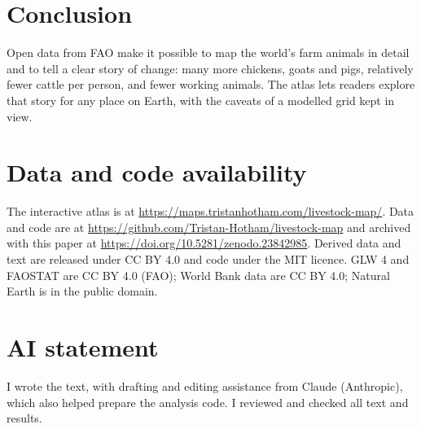 \documentclass[11pt,a4paper]{article}
\begin{document}
\section{Conclusion}
Open data from FAO make it possible to map the world's farm animals in detail and to tell a clear story of change: many more chickens, goats and pigs, relatively fewer cattle per person, and fewer working animals. The atlas lets readers explore that story for any place on Earth, with the caveats of a modelled grid kept in view.

\section*{Data and code availability}
The interactive atlas is at \url{https://maps.tristanhotham.com/livestock-map/}. Data and code are at \url{https://github.com/Tristan-Hotham/livestock-map} and archived with this paper at \url{https://doi.org/10.5281/zenodo.23842985}. Derived data and text are released under CC BY 4.0 and code under the MIT licence. GLW 4 and FAOSTAT are CC BY 4.0 (FAO); World Bank data are CC BY 4.0; Natural Earth is in the public domain.

\section*{AI statement}
I wrote the text, with drafting and editing assistance from Claude (Anthropic), which also helped prepare the analysis code. I reviewed and checked all text and results.
\end{document}
